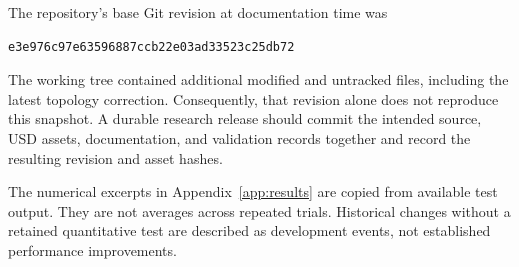 \documentclass[11pt,letterpaper]{article}
\begin{document}
The repository's base Git revision at documentation time was
\begin{lstlisting}
e3e976c97e63596887ccb22e03ad33523c25db72
\end{lstlisting}
The working tree contained additional modified and untracked files, including
the latest topology correction. Consequently, that revision alone does not
reproduce this snapshot. A durable research release should commit the intended
source, USD assets, documentation, and validation records together and record
the resulting revision and asset hashes.

The numerical excerpts in Appendix~\ref{app:results} are copied from available
test output. They are not averages across repeated trials. Historical changes
without a retained quantitative test are described as development events, not
established performance improvements.
\end{document}
